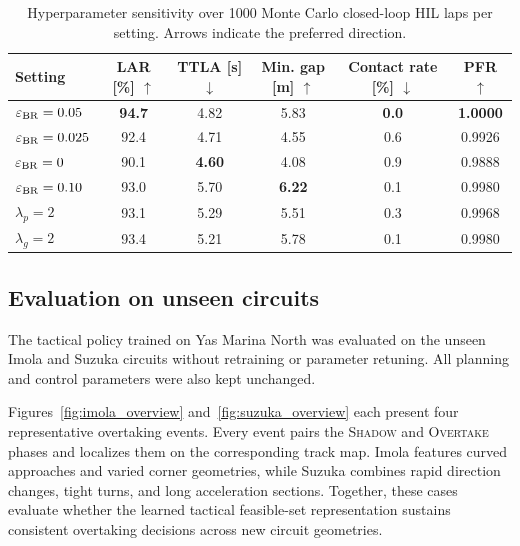 \documentclass[journal,twoside,web]{ieeecolor}
\begin{document}
\begin{table}[H]
\centering
\footnotesize
\setlength{\tabcolsep}{1.2pt}
\renewcommand{\arraystretch}{1.08}
\caption{Hyperparameter sensitivity over 1000 Monte Carlo closed-loop HIL
laps per setting. Arrows indicate the preferred direction.}
\label{tab:sensitivity}
\begin{tabular}{@{}lccccc@{}}
\toprule
Setting & \shortstack{LAR [\%]\\$\uparrow$} &
\shortstack{TTLA [s]\\$\downarrow$} &
\shortstack{Min. gap [m]\\$\uparrow$} &
\shortstack{Contact rate [\%]\\$\downarrow$} &
\shortstack{PFR\\$\uparrow$} \\
\midrule
$\varepsilon_{\rm BR}=0.05$
& \textbf{94.7} & 4.82 & 5.83 & \textbf{0.0} & \textbf{1.0000} \\
$\varepsilon_{\rm BR}=0.025$
& 92.4 & 4.71 & 4.55 & 0.6 & 0.9926 \\
$\varepsilon_{\rm BR}=0$
& 90.1 & \textbf{4.60} & 4.08 & 0.9 & 0.9888 \\
$\varepsilon_{\rm BR}=0.10$
& 93.0 & 5.70 & \textbf{6.22} & 0.1 & 0.9980 \\
$\lambda_p=2$
& 93.1 & 5.29 & 5.51 & 0.3 & 0.9968 \\
$\lambda_g=2$
& 93.4 & 5.21 & 5.78 & 0.1 & 0.9980 \\
\bottomrule
\end{tabular}
\end{table}

\subsection{Evaluation on unseen circuits}
\label{subsec:unseen_track}

The tactical policy trained on Yas Marina North was evaluated on the
unseen Imola and Suzuka circuits without retraining or parameter retuning. All
planning and control parameters were also kept unchanged.

Figures~\ref{fig:imola_overview} and~\ref{fig:suzuka_overview} each present four
representative overtaking events. Every event pairs the \textsc{Shadow} and
\textsc{Overtake} phases and localizes them on the corresponding track map.
Imola features curved approaches and varied corner geometries, while Suzuka
combines rapid direction changes, tight turns, and long acceleration sections.
Together, these cases evaluate whether the learned tactical feasible-set
representation sustains consistent overtaking decisions across new circuit
geometries.
\end{document}
